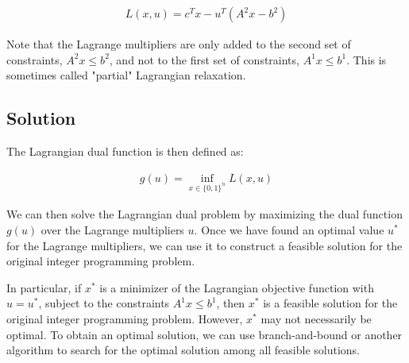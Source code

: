 \begin{align*}
L(x,u) = c^T x - u^T (A^2 x - b^2)
\end{align*}

Note that the Lagrange multipliers are only added to the second set of constraints, $A^2 x \leq b^2$, and not to the first set of constraints, $A^1 x \leq b^1$. This is sometimes called "partial" Lagrangian relaxation.

\subsection{Solution}

The Lagrangian dual function is then defined as:

\begin{align*}
g(u) = \inf_{x \in \{0,1\}^n} L(x,u)
\end{align*}

We can then solve the Lagrangian dual problem by maximizing the dual function $g(u)$ over the Lagrange multipliers $u$. Once we have found an optimal value $u^*$ for the Lagrange multipliers, we can use it to construct a feasible solution for the original integer programming problem.

In particular, if $x^*$ is a minimizer of the Lagrangian objective function with $u = u^*$, subject to the constraints $A^1 x \leq b^1$, then $x^*$ is a feasible solution for the original integer programming problem. However, $x^*$ may not necessarily be optimal. To obtain an optimal solution, we can use branch-and-bound or another algorithm to search for the optimal solution among all feasible solutions.


